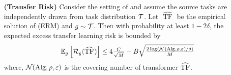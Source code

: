 \begin{theorem}\textbf{(Transfer Risk)}
Consider the setting of  and assume the source tasks are independently drawn from task distribution $\mathcal{T}$. Let $\widehat{\text { TF }}$ be the empirical solution of (ERM) and $g \sim \mathcal{T}$. Then with probability at least $1-2 \delta$, the expected excess transfer learning risk is bounded by
\begin{align*}
\mathbb{E}_{g}\left[\mathcal{R}_{g}(\widehat{\mathrm{TF}}_{})\right] \leq 4 \tfrac{C}{\sqrt{M}} +B \sqrt{\tfrac{2 \log (\mathcal{N}(\mathrm{Alg}, \rho, \varepsilon) / \delta)}{M}}
\end{align*}
where, $\mathcal{N}(\mathrm{Alg}, \rho, \varepsilon)$ is the covering number of transformer $\widehat{\mathrm{TF}}_{}$. 
\end{theorem}


